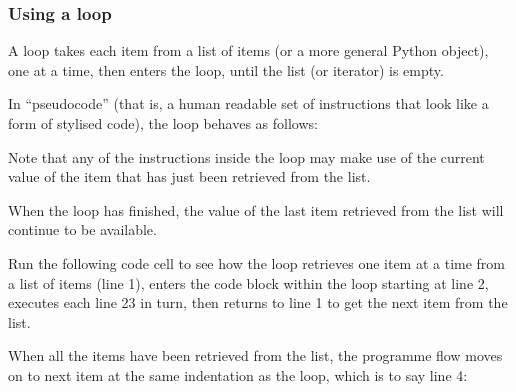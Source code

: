 \documentclass[letterpaper,10pt,english]{sphinxmanual}
\begin{document}
{\subsubsection{Using a  loop}
\label{\detokenize{content/02_Robot_Lab/Section_00_01:Using-a-for...in...-loop}}
A  loop takes each item from a list of items (or a more general Python  object), one at a time, then enters the loop, until the list (or iterator) is empty.

In “pseudo\sphinxhyphen{}code” (that is, a human readable set of instructions that look like a form of stylised code), the  loop behaves as follows:

\begin{sphinxVerbatim}[commandchars=\\\{\}]
               


   

   

   

\end{sphinxVerbatim}

Note that any of the instructions inside the loop may make use of the current value of the item that has just been retrieved from the list.

When the loop has finished, the value of the last item retrieved from the list will continue to be available.

Run the following code cell to see how the  loop retrieves one item at a time from a list of items (line 1), enters the code block within the loop starting at line 2, executes each line 2\sphinxhyphen{}3 in turn, then returns to line 1 to get the next item from the list.

When all the items have been retrieved from the list, the programme flow moves on to next item at the same indentation as the  loop, which is to say line 4:

}
\end{document}
